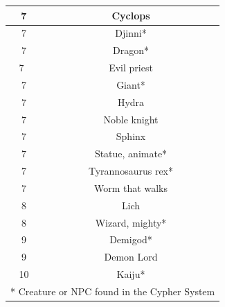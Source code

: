 \begin{longtable}{|c|c|}
7  & Cyclops \\ \hline
7  & Djinni* \\ \hline
7  & Dragon* \\ \hline
7  & Evil priest \\ \hline
7  & Giant* \\ \hline
7  & Hydra \\ \hline
7  & Noble knight \\ \hline
7  & Sphinx \\ \hline
7  & Statue, animate* \\ \hline
7  & Tyrannosaurus rex* \\ \hline
7  & Worm that walks \\ \hline
8  & Lich \\ \hline
8  & Wizard, mighty* \\ \hline
9  & Demigod* \\ \hline
9  & Demon Lord \\ \hline
10  & Kaiju* \\ \hline
\multicolumn{2}{|c|}{{* Creature or NPC found in the Cypher System}}  \\ \hline

\end{longtable}

